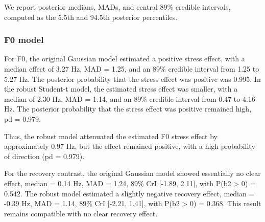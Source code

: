 \documentclass[
  english,
  man,floatsintext]{apa6}
\begin{document}
We report posterior medians, MADs, and central 89\% credible intervals, computed as the 5.5th and 94.5th posterior percentiles.

\subsubsection{F0 model}\label{f0-model}

For F0, the original Gaussian model estimated a positive stress effect, with a median effect of 3.27 Hz, MAD = 1.25, and an 89\% credible interval from 1.25 to 5.27 Hz. The posterior probability that the stress effect was positive was 0.995. In the robust Student-t model, the estimated stress effect was smaller, with a median of 2.30 Hz, MAD = 1.14, and an 89\% credible interval from 0.47 to 4.16 Hz. The posterior probability that the stress effect was positive remained high, pd = 0.979.

Thus, the robust model attenuated the estimated F0 stress effect by approximately 0.97 Hz, but the effect remained positive, with a high probability of direction (pd = 0.979).

For the recovery contrast, the original Gaussian model showed essentially no clear effect, median = 0.14 Hz, MAD = 1.24, 89\% CrI {[}-1.89, 2.11{]}, with P(b2 \textgreater{} 0) = 0.542. The robust model estimated a slightly negative recovery effect, median = -0.39 Hz, MAD = 1.14, 89\% CrI {[}-2.21, 1.41{]}, with P(b2 \textgreater{} 0) = 0.368. This result remains compatible with no clear recovery effect.
\end{document}
